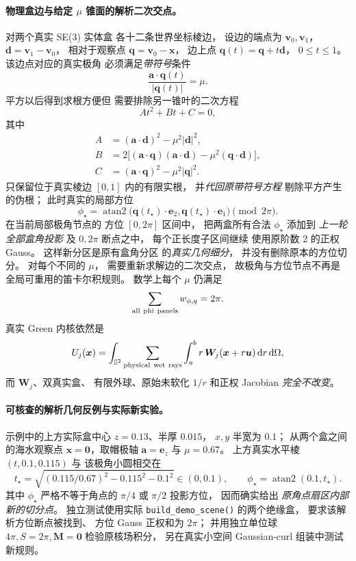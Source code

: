\paragraph{物理盒边与给定 $\mu$ 锥面的解析二次交点。}
对两个真实 SE(3) 实体盒
各十二条世界坐标棱边，
设边的端点为 $\bm v_0,\bm v_1$，
$\bm d=\bm v_1-\bm v_0$，
相对于观察点
$\bm q=\bm v_0-\bm x$，
边上点
$\bm q(t)=\bm q+t\bm d$，
$0\le t\le1$。
该边点对应的真实极角
必须满足\emph{带符号}条件
\[
 \frac{\bm a\cdot\bm q(t)}
 {|\bm q(t)|}=\mu.
\]
平方以后得到求根方便但
需要排除另一锥叶的二次方程
\[
 A t^2+B t+C=0,
\]
其中
\begin{align}
 A&=(\bm a\cdot\bm d)^2
       -\mu^2|\bm d|^2,\\
 B&=2\bigl[
   (\bm a\cdot\bm q)
   (\bm a\cdot\bm d)
       -\mu^2(\bm q\cdot\bm d)\bigr],\\
 C&=(\bm a\cdot\bm q)^2
       -\mu^2|\bm q|^2.
\end{align}
只保留位于真实棱边
$[0,1]$ 内的有限实根，
并\emph{代回原带符号方程}
剔除平方产生的伪根；
此时真实的局部方位
\[
 \phi_\star=
 \operatorname{atan2}\bigl(
 \bm q(t_\star)\cdot\bm e_2,
 \bm q(t_\star)\cdot\bm e_1\bigr)
 \pmod{2\pi}.
\]
在当前局部极角节点的
方位 $[0,2\pi]$ 区间中，
把两盒所有合法
$\phi_\star$ 添加到
\emph{上一轮全部盒角投影}
及 $0,2\pi$ 断点之中，
每个正长度子区间继续
使用原阶数 2 的正权 Gauss。
这样新分区是原有盒角分区
的\emph{真实几何细分}，
并没有删除原本的方位切分。
对每个不同的 $\mu$，
需要重新求解边的二次交点，
故极角与方位节点不再是
全局可重用的笛卡尔积规则。
数学上每个 $\mu$ 仍满足
\[
 \sum_{\rm all\ phi\ panels}
    w_{\phi,q}=2\pi.
\]
真实 Green 内核依然是
\[
 U_j(\bm x)=
 \int_{\mathbb S^2}
 \sum_{\rm physical\ wet\ rays}
 \int_a^b r\,\bm W_j(\bm x+r\bm u)
 \,\mathrm dr\,\mathrm d\Omega,
\]
而 $\bm W_j$、双真实盒、
有限外球、原始未软化
$1/r$ 和正权 Jacobian
\emph{完全不改变}。

\paragraph{可核查的解析几何反例与实际新实验。}
示例中的上方实际盒中心
$z=0.13$、半厚 $0.015$，
$x,y$ 半宽为 $0.1$；
从两个盒之间的海水观察点
$\bm x=\bm0$，取帽极轴
$\bm a=\bm e_z$ 与 $\mu=0.67$。
上方真实水平棱
$(t,0.1,0.115)$ 与
该极角小圆相交在
\[
 t_\star=
 \sqrt{(0.115/0.67)^2
       -0.115^2-0.1^2}
 \in(0,0.1),
 \qquad
 \phi_\star=\operatorname{atan2}(0.1,t_\star).
\]
其中 $\phi_\star$
严格不等于角点的
$\pi/4$ 或 $\pi/2$
投影方位，
因而确实给出
\emph{原角点扇区内部新的切分点}。
独立测试使用实际
\texttt{build\_demo\_scene()}
的两个绝缘盒，
要求该解析方位断点被找到、
方位 Gauss 正权和为 $2\pi$；
并用独立单位球
$4\pi,S=2\pi,\bm M=\bm0$
检验原核场积分，
另在真实小空间
Gaussian-curl 组装中测试新规则。

